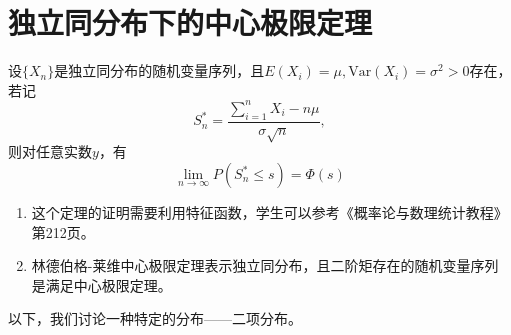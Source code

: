 \section{独立同分布下的中心极限定理}
\begin{theorem}
设$\{X_n\}$是独立同分布的随机变量序列，且$E(X_i)=\mu,\text{Var}(X_i) = \sigma^2>0$存在，若记
$$
S_n^{\ast} = \frac{\sum_{i=1}^n X_i - n \mu}{\sigma \sqrt{n}},
$$
则对任意实数$y$，有
$$
\lim_{n\rightarrow \infty} P(S_n^{\ast} \leq s) = \Phi(s)
$$
\end{theorem}
\begin{remark}
    \begin{enumerate}
        \item 这个定理的证明需要利用特征函数，学生可以参考《概率论与数理统计教程》第212页。
        \item 林德伯格-莱维中心极限定理表示独立同分布，且二阶矩存在的随机变量序列是满足中心极限定理。
    \end{enumerate}
\end{remark}

以下，我们讨论一种特定的分布——二项分布。

